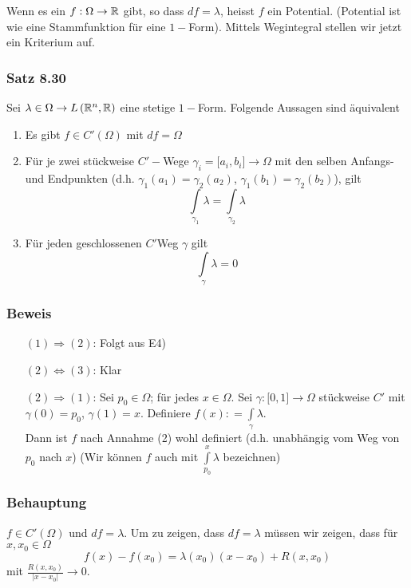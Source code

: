 Wenn es ein $f:\Omega\to\mathbb{R}$ gibt, so dass $df=\lambda$, heisst $f$ ein Potential. (Potential ist wie eine Stammfunktion für eine $1-$Form). Mittels Wegintegral stellen wir jetzt ein Kriterium auf.

\subsubsection*{Satz 8.30}
Sei $\lambda\in\Omega\to L\left( \mathbb{R}^n,\mathbb{R}\right)$ eine stetige $1-$Form. Folgende Aussagen sind äquivalent
\begin{enumerate}
\item Es gibt $f\in C'\left( \Omega\right)$ mit $df=\Omega$
\item Für je zwei stückweise $C'-$Wege $\gamma_i=\lbrack a_i,b_i\rbrack\to\Omega$ mit den selben Anfangs- und Endpunkten (d.h. $\gamma_1\left( a_1\right)=\gamma_2\left(a_2\right)$, $\gamma_1\left( b_1\right)=\gamma_2\left(b_2\right)$), gilt \[\int\limits_{{\gamma _1}} \lambda   = \int\limits_{{\gamma _2}} \lambda  \]
\item Für jeden geschlossenen $C'$Weg $\gamma$ gilt \[\int\limits_\gamma  \lambda   = 0\]
\end{enumerate}

\subsubsection*{Beweis}
\begin{enumerate}[align=left]
\item[$(1)\Rightarrow (2)$:] Folgt aus E4)
\item[$(2)\Leftrightarrow (3)$:] Klar
\item[$(2)\Rightarrow (1)$:] Sei $p_0\in\Omega$; für jedes $x\in\Omega$. Sei $\gamma:\lbrack 0,1\rbrack\to\Omega$ stückweise $C'$ mit $\gamma(0)=p_0$, $\gamma(1)=x$. Definiere $f(x): = \int\limits_\gamma  \lambda $.\\

Dann ist $f$ nach Annahme (2) wohl definiert (d.h. unabhängig vom Weg von $p_0$ nach $x$) (Wir können $f$ auch mit $\int\limits_{{p_0}}^x \lambda  $ bezeichnen)
\end{enumerate}

\subsubsection*{Behauptung}
$f\in C'\left( \Omega\right)$ und $df=\lambda$. Um zu zeigen, dass $df=\lambda$ müssen wir zeigen, dass für $x,x_0\in\Omega$
\[f\left(x\right)-f\left(x_0\right)=\lambda\left(x_0\right)\left( x-x_0\right)+R\left( x,x_0\right)\] mit $\frac{R\left( x,x_0\right)}{\left| x-x_0\right|}\to 0$.\\


